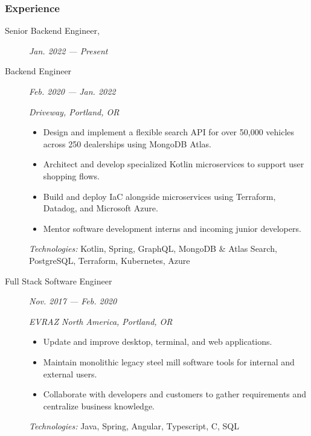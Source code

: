 \documentclass{article}
\begin{document}

\subsubsection*{Experience}

    \begin{description}
		
	\item[Senior Backend Engineer,] \hfill \textit{Jan. 2022 — Present}
	\item[Backend Engineer] \hfill \textit{Feb. 2020 — Jan. 2022}
		
        \textit{Driveway, Portland, OR}
        \begin{itemize}
        \item Design and implement a flexible search API for over 50,000 vehicles across 250 dealerships using MongoDB Atlas.
        \item Architect and develop specialized Kotlin microservices to support user shopping flows.
        \item Build and deploy IaC alongside microservices using Terraform, Datadog, and Microsoft Azure.
        \item Mentor software development interns and incoming junior developers.
        \end{itemize}
        \textit{Technologies:} Kotlin, Spring, GraphQL, MongoDB \& Atlas Search, PostgreSQL, Terraform, Kubernetes, Azure
		\vspace{0.5em}

	\item[Full Stack Software Engineer] \hfill \textit{Nov. 2017 — Feb. 2020}
		
        \textit{EVRAZ North America, Portland, OR}
        \begin{itemize}     
            \item Update and improve desktop, terminal, and web applications.
            \item Maintain monolithic legacy steel mill software tools for internal and external users.
            \item Collaborate with developers and customers to gather requirements and centralize business knowledge.
        \end{itemize}
        \textit{Technologies:} Java, Spring, Angular, Typescript, C, SQL
        
    \end{description}
\end{document}
